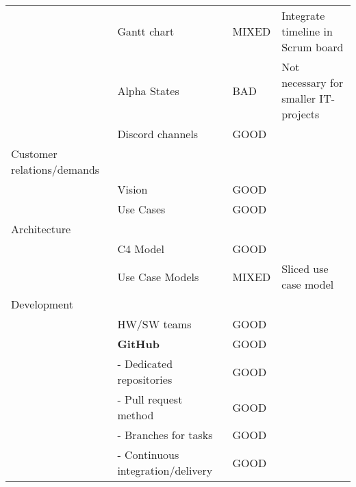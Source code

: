 \begin{table}[htbp]
\begin{center}
{\begin{tabular}{llll}
                           & Gantt chart                       & \cellcolor{yellow} MIXED & Integrate timeline in Scrum board     \\
                           & Alpha States                      & \cellcolor{red} BAD   & Not necessary for smaller IT-projects \\
                           & Discord channels                  & \cellcolor{green} GOOD  &                                       \\
\rowcolor{grey} Customer relations/demands &                                   &       &                                       \\
                           & Vision                            & \cellcolor{green} GOOD  &                                       \\
                           & Use Cases                         & \cellcolor{green} GOOD  &                                       \\
\rowcolor{grey} Architecture               &                                   &       &                                       \\
                           & C4 Model                          & \cellcolor{green} GOOD  &                                       \\
                           & Use Case Models                   & \cellcolor{yellow} MIXED & Sliced use case model                 \\
\rowcolor{grey} Development                &                                   &       &                                       \\
                           & HW/SW teams                       & \cellcolor{green} GOOD  &                                       \\
                           & \textbf{GitHub}                   & \cellcolor{green} GOOD  &                                       \\
                           & - Dedicated repositories          & \cellcolor{green} GOOD  &                                       \\
                           & - Pull request method             & \cellcolor{green} GOOD  &                                       \\
                           & - Branches for tasks              & \cellcolor{green} GOOD  &                                       \\
                           & - Continuous integration/delivery & \cellcolor{green} GOOD  &                                       \\

\end{tabular}}
\end{center}
\end{table}
